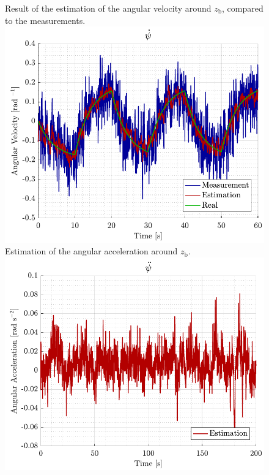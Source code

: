 \begin{figure}[H]
    \captionbox 
    {   
        Result of the estimation of the angular velocity around $z_\mathrm{b}$, compared to the measurements.
        \label{fig:real_yawdot}
    }                                                                 
    {                                                                  
        \includegraphics[width=.45\textwidth]{figures/sim_yawdot}         
    }                                                                    
    \hspace{5pt}                                                          
    \captionbox  
    {      
        Estimation of the angular acceleration around $z_\mathrm{b}$.
        \label{fig:real_yawddot}
    }                                                                          
    {
        \includegraphics[width=.45\textwidth]{figures/real_yawddot}
    }
\end{figure}

\cite{MSalari}